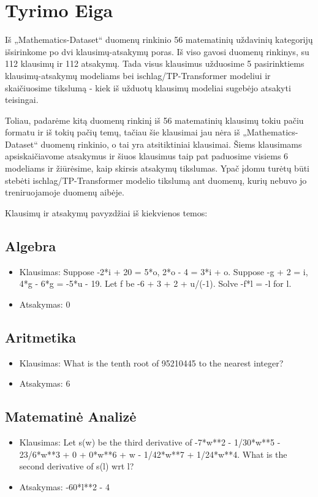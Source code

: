 \documentclass[conference]{IEEEtran}
\begin{document}
\section{Tyrimo Eiga}
Iš „Mathematics-Dataset“ duomenų rinkinio 56 matematinių uždavinių kategorijų išsirinkome
po dvi klausimų-atsakymų poras. Iš viso gavosi duomenų rinkinys, su 112 klausimų ir 112 atsakymų.
Tada visus klausimus užduosime 5 pasirinktiems klausimų-atsakymų modeliams bei ischlag/TP-Transformer modeliui ir skaičiuosime
tikslumą - kiek iš užduotų klausimų modeliai sugebėjo atsakyti teisingai. \par
Toliau, padarėme kitą duomenų rinkinį iš 56 matematinių klausimų tokiu pačiu formatu ir iš tokių pačių temų,
tačiau šie klausimai jau nėra iš „Mathematics-Dataset“ duomenų rinkinio, o tai yra
atsitiktiniai klausimai. Šiems klausimams apsiskaičiavome atsakymus ir šiuos klausimus taip pat paduosime
visiems 6 modeliams ir žiūrėsime, kaip skirsis atsakymų tikslumas. Ypač įdomu turėtų būti stebėti
ischlag/TP-Transformer modelio tikslumą ant duomenų, kurių nebuvo jo treniruojamoje duomenų aibėje. \par
Klausimų ir atsakymų pavyzdžiai iš kiekvienos temos:
\subsection{Algebra}
\begin{itemize}
    \item Klausimas: Suppose -2*i + 20 = 5*o, 2*o - 4 = 3*i + o. Suppose -g + 2 = i, 4*g - 6*g = -5*u - 19. Let f be -6 + 3 + 2 + u/(-1). Solve -f*l = -l for l.
    \item Atsakymas: 0
\end{itemize}
\subsection{Aritmetika}
\begin{itemize}
    \item Klausimas: What is the tenth root of 95210445 to the nearest integer?
    \item Atsakymas: 6
\end{itemize}
\subsection{Matematinė Analizė}
\begin{itemize}
    \item Klausimas: Let s(w) be the third derivative of -7*w**2 - 1/30*w**5 - 23/6*w**3 + 0 + 0*w**6 + w - 1/42*w**7 + 1/24*w**4. What is the second derivative of s(l) wrt l?
    \item Atsakymas: -60*l**2 - 4
\end{itemize}
\end{document}
